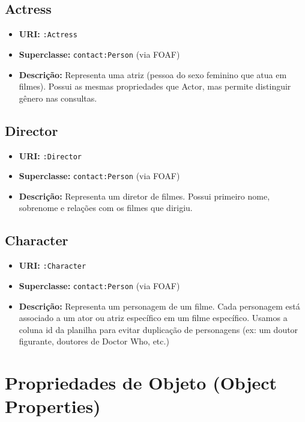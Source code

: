 \documentclass[12pt,a4paper]{article}
\begin{document}
\subsection{Actress}

\begin{itemize}
    \item \textbf{URI:} \texttt{:Actress}
    \item \textbf{Superclasse:} \texttt{contact:Person} (via FOAF)
    \item \textbf{Descrição:} Representa uma atriz (pessoa do sexo feminino que atua em filmes). Possui as mesmas propriedades que Actor, mas permite distinguir gênero nas consultas.
\end{itemize}

\subsection{Director}

\begin{itemize}
    \item \textbf{URI:} \texttt{:Director}
    \item \textbf{Superclasse:} \texttt{contact:Person} (via FOAF)
    \item \textbf{Descrição:} Representa um diretor de filmes. Possui primeiro nome, sobrenome e relações com os filmes que dirigiu.
\end{itemize}

\subsection{Character}

\begin{itemize}
    \item \textbf{URI:} \texttt{:Character}
    \item \textbf{Superclasse:} \texttt{contact:Person} (via FOAF)
    \item \textbf{Descrição:} Representa um personagem de um filme. Cada personagem está associado a um ator ou atriz específico em um filme específico. Usamos a coluna id da planilha para evitar duplicação de personagens (ex: um doutor figurante, doutores de Doctor Who, etc.) 
\end{itemize}

\newpage
\section{Propriedades de Objeto (Object Properties)}
\end{document}
